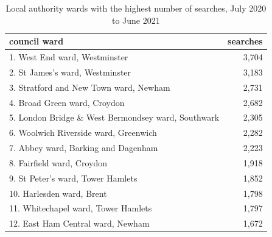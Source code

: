 \documentclass[
  a4paper,
  twoside, 11pt]{article}
\begin{document}
\begin{table}

\caption{\label{tab:table-ward}Local authority wards with the highest number of searches, July 2020 to June 2021}
\centering
\begin{tabular}[t]{lr}
\toprule
council ward & searches\\
\midrule
1. West End ward, Westminster & 3,704\\
2. St James's ward, Westminster & 3,183\\
3. Stratford and New Town ward, Newham & 2,731\\
4. Broad Green ward, Croydon & 2,682\\
5. London Bridge \& West Bermondsey ward, Southwark & 2,305\\
6. Woolwich Riverside ward, Greenwich & 2,282\\
7. Abbey ward, Barking and Dagenham & 2,223\\
8. Fairfield ward, Croydon & 1,918\\
9. St Peter's ward, Tower Hamlets & 1,852\\
10. Harlesden ward, Brent & 1,798\\
11. Whitechapel ward, Tower Hamlets & 1,797\\
12. East Ham Central ward, Newham & 1,672\\
\bottomrule
\end{tabular}
\end{table}

\restoregeometry
\end{document}
